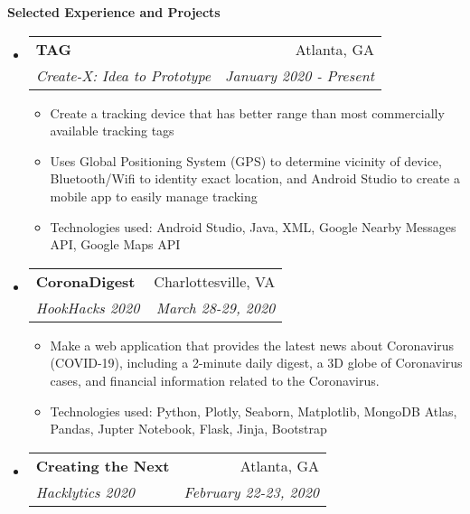 \documentclass[letterpaper,11pt]{article}
\makeatletter
\newcommand{\resitem}[1]{\item #1 \vspace{-2pt}}
\newcommand{\resheading}[1]{{\large \colorbox{mygrey}{\begin{minipage}{\textwidth}{\textbf{#1 \vphantom{p\^{E}}}}\end{minipage}}}}
\newcommand{\ressubheading}[4]{
\begin{tabular*}{7.0in}{l@{\extracolsep{\fill}}r}
		\textbf{#1} & #2 \\
		\textit{#3} & \textit{#4} \\
\end{tabular*}\vspace{-6pt}}
\makeatother
\begin{document}
\resheading{Selected Experience and Projects}


\begin{itemize}
\item
    \ressubheading{TAG}{Atlanta, GA}{Create-X: Idea to Prototype}{January 2020 - Present}
    \begin{itemize}
        \item Create a tracking device that has better range than most commercially available tracking tags
        \item Uses Global Positioning System (GPS) to determine vicinity of device, Bluetooth/Wifi to identity exact location, and Android Studio to create a mobile app to easily manage tracking
        \item Technologies used: Android Studio, Java, XML, Google Nearby Messages API, Google Maps API
    \end{itemize}
\item
    \ressubheading{CoronaDigest}{Charlottesville, VA}{HookHacks 2020}{March 28-29, 2020}
    \begin{itemize}
        \resitem{Make a web application that provides the latest news about Coronavirus (COVID-19), including a 2-minute daily digest, a 3D globe of Coronavirus cases, and financial information related to the Coronavirus.}
        \resitem{Technologies used: Python, Plotly, Seaborn, Matplotlib, MongoDB Atlas, Pandas, Jupter Notebook, Flask, Jinja, Bootstrap}
    \end{itemize}
\item
    \ressubheading{Creating the Next}{Atlanta, GA}{Hacklytics 2020}{February 22-23, 2020}

\end{itemize}
\end{document}
